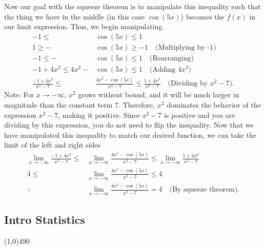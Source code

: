 \documentclass{report}
\begin{document}
      \bigbreak \noindent 
      Now our goal with the squeeze theorem is to manipulate this inequality such that the thing we have in the middle (in this case $\cos{(5x)}$) becomes the $f(x)$ in our limit expression.
      \bigbreak \noindent 
      Thus, we begin manipulating.
      \begin{align*}
        -1 \leq &\cos{(5x)} \leq 1 \\
        1 \geq -&\cos{(5x)} \geq -1 \quad \text{(Multiplying by -1)}  \\
        -1 \leq -&\cos{(5x)} \leq 1 \quad \text{(Rearranging)} \\
        -1+4x^{2} \leq 4x^{2}-&\cos{(5x)} \leq 1 \quad \text{(Adding $4x^{2}$)} \\
        \frac{-1+4x^{2}}{x^{2}-7} \leq &\frac{4x^{2}-\cos{(5x)}}{x^{2}-7} \leq \frac{1+4x^{2}}{x^{2}-7} \quad \text{(Dividing by $x^{2}-7$)}
      .\end{align*}
      Note: For \( x \to -\infty \), \( x^2 \) grows without bound, and it will be much larger in magnitude than the constant term 7. Therefore, \( x^2 \) dominates the behavior of the expression \( x^2 - 7 \), making it positive. Since \( x^2 - 7 \) is positive and you are dividing by this expression, you do not need to flip the inequality.
      \bigbreak \noindent 
      Now that we have manipulated this inequality to match our desired function, we can take the limit of the left and right sides
      \begin{align*}
        \lim\limits_{x \to -\infty}{\frac{-1+4x^{2}}{x^{2}-7}} \leq &\lim\limits_{x \to -\infty}{\frac{4x^{2}-\cos{(5x)}}{x^{2}-7}} \leq \lim\limits_{x \to -\infty}{\frac{1+4x^{2}}{x^{2}-7}} \\
        4 \leq &\lim\limits_{x \to -\infty}{\frac{4x^{2}-\cos{(5x)}}{x^{2}-7}} \leq 4 \\
        \therefore &\lim\limits_{x \to -\infty}{\frac{4x^{2}-\cos{(5x)}}{x^{2}-7}} = 4 \quad \text{(By squeeze theorem)}
      .\end{align*}

      \pagebreak \bigbreak \noindent
      \begin{center}
        \section{Intro Statistics}
      \end{center}
      \line(1,0){490}
      \bigbreak \noindent 
\end{document}
